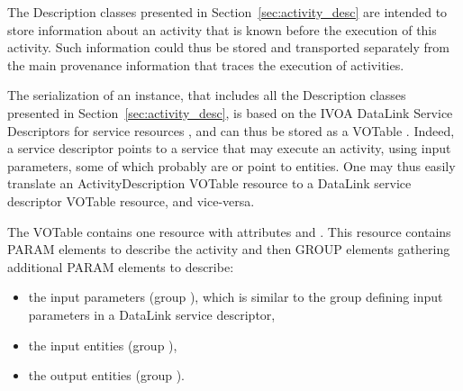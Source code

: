


The Description classes presented in Section~\ref{sec:activity_desc} are intended to store information about an activity that is known before the execution of this activity. Such information could thus be stored and transported separately from the main provenance information that traces the execution of activities.

The serialization of an  instance, that includes all the Description classes presented in Section~\ref{sec:activity_desc}, is based on the IVOA DataLink Service Descriptors for service resources \citep{std:DataLink}, and can thus be stored as a VOTable \citep{std:VOTABLE}. Indeed, a service descriptor points to a service that may execute an activity, using input parameters, some of which probably are or point to entities. One may thus easily translate an ActivityDescription VOTable resource to a DataLink service descriptor VOTable resource, and vice-versa.

The VOTable contains one resource with attributes  and . This resource contains PARAM elements to describe the activity and then GROUP elements gathering additional PARAM elements to describe:
\begin{itemize}
 \item the input parameters (group ), which is similar to the group defining input parameters in a DataLink service descriptor,
 \item the input entities (group ),
 \item the output entities (group ). 
 \end{itemize}
 
